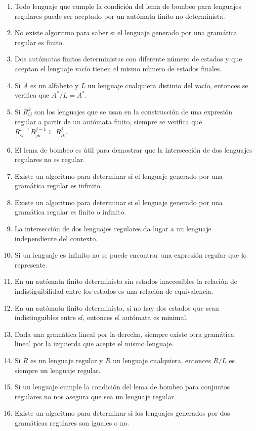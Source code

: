 \begin{enumerate}
    \item Todo lenguaje que cumple la condición del lema de bombeo para lenguajes regulares puede ser aceptado por un autómata finito no determinista.
    \item No existe algoritmo para saber si el lenguaje generado por una gramática regular es finito.
    \item Dos autómatas finitos deterministas con diferente número de estados y que aceptan el lenguaje vacío tienen el mismo número de estados finales.
    \item Si $A$ es un alfabeto y $L$ un lenguaje cualquiera distinto del vacío, entonces se verifica que $A^\ast / L = A^\ast$.
    \item Si $R^k_{ij}$ son los lenguajes que se usan en la construcción de una expresión regular a partir de un autómata finito, siempre se verifica que $R^{i-1}_{ij}R^{j-1}_{jk}\subseteq R^{j}_{ik}$.
    \item El lema de bombeo es útil para demostrar que la intersección de dos lenguajes regulares no es regular.
    \item Existe un algoritmo para determinar si el lenguaje generado por una gramática regular es infinito.
    \item Existe un algoritmo para determinar si el lenguaje generado por una gramática regular es finito o infinito.
    \item La intersección de dos lenguajes regulares da lugar a un lenguaje independiente del contexto.
    \item Si un lenguaje es infinito no se puede encontrar una expresión regular que lo represente.
    \item En un autómata finito determinista sin estados inaccesibles la relación de indistiguibilidad entre los estados es una relación de equivalencia.
    \item En un autómata finito determinista, si no hay dos estados que sean indistinguibles entre sí, entonces el autómata es minimal.
    \item Dada una gramática lineal por la derecha, siempre existe otra gramática lineal por la izquierda que acepte el mismo lenguaje.
    \item Si $R$ es un lenguaje regular y $R$ un lenguaje cualquiera, entonces $R/L$ es siempre un lenguaje regular.
    \item Si un lenguaje cumple la condición del lema de bombeo para conjuntos regulares no nos asegura que sea un lenguaje regular.
    \item Existe un algoritmo para determinar si los lenguajes generados por dos gramáticas regulares son iguales o no.

\end{enumerate}
